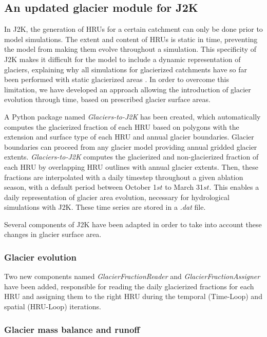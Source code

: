 \subsection{An updated glacier module for J2K}

In J2K, the generation of HRUs for a certain catchment can only be done prior to model simulations. The extent and content of HRUs is static in time, preventing the model from making them evolve throughout a simulation. This specificity of J2K makes it difficult for the model to include a dynamic representation of glaciers, explaining why all simulations for glacierized catchments have so far been performed with static glacierized areas \citep{gao_test_2012, nepal_understanding_2014}. In order to overcome this limitation, we have developed an approach allowing the introduction of glacier evolution through time, based on prescribed glacier surface areas. 

A Python package named \textit{Glaciers-to-J2K} has been created, which automatically computes the glacierized fraction of each HRU based on polygons with the extension and surface type of each HRU and annual glacier boundaries. Glacier boundaries can proceed from any glacier model providing annual gridded glacier extents. \textit{Glaciers-to-J2K} computes the glacierized and non-glacierized fraction of each HRU by overlapping HRU outlines with annual glacier extents. Then, these fractions are interpolated with a daily timestep throughout a given ablation season, with a default period between October 1${st}$ to March 31${st}$. This enables a daily representation of glacier area evolution, necessary for hydrological simulations with J2K. These time series are stored in a \textit{.dat} file.

Several components of J2K have been adapted in order to take into account these changes in glacier surface area. 

\subsubsection{Glacier evolution}

Two new components named \textit{GlacierFractionReader} and \textit{GlacierFractionAssigner} have been added, responsible for reading the daily glacierized fractions for each HRU and assigning them to the right HRU during the temporal (Time-Loop) and spatial (HRU-Loop) iterations. 

\subsubsection{Glacier mass balance and runoff}

